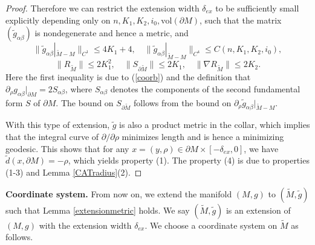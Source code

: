 \documentclass[11pt,letterpaper]{amsart}
\numberwithin{equation}{section}
\theoremstyle{definition}
\theoremstyle{plain}
\theoremstyle{definition}
\theoremstyle{plain}
\theoremstyle{definition}
\theoremstyle{plain}
\newcommand{\vol}{\textrm{vol}}
\begin{document}
\begin{proof}
Therefore we can restrict the extension width $\delta_{ex}$ to be sufficiently small explicitly depending only on $n,K_1,K_2,i_0,\vol(\partial M)$, such that the matrix $(\widetilde{g}_{\alpha\beta})$ is nondegenerate and hence a metric, and 
\begin{equation}\label{curvatureextended}
\|\widetilde{g}_{\alpha\beta}|_{\widetilde{M}-M}\|_{C^1}\leqslant 4 K_1+4,\quad \|\widetilde{g}_{\alpha\beta}|_{\widetilde{M}-M}\|_{C^4}\leqslant C(n,K_1,K_2,i_0),
\end{equation}
$$\|R_{\widetilde{M}}\|\leqslant 2K_1^2, \quad \|S_{\partial \widetilde{M}}\|\leqslant 2K_1, \quad \|\nabla R_{\widetilde{M}}\|\leqslant 2K_2.$$
Here the first inequality is due to (\ref{coorb}) and the definition that $\partial_{\rho} g_{\alpha\beta} |_{\partial M}=2S_{\alpha\beta}$,
where $S_{\alpha\beta}$ denotes the components of the second fundamental form $S$ of $\partial M$. The bound on $S_{\partial \widetilde{M}}$ follows from the bound on $\partial_{\rho} \widetilde{g}_{\alpha\beta}|_{\widetilde{M}-M}$.

With this type of extension, $\widetilde{g}$ is also a product metric in the collar, which implies that the integral curve of $\partial/\partial \rho$ minimizes length and is hence a minimizing geodesic. This shows that for any $x=(y,\rho)\in \partial M \times[-\delta_{ex},0]$, we have $\widetilde{d}(x,\partial M)=-\rho$, which yields property (1). The property (4) is due to properties (1-3) and Lemma \ref{CATradius}(2).
\end{proof}


\noindent \textbf{Coordinate system.} From now on, we extend the manifold $(M,g)$ to $(\widetilde{M},\widetilde{g})$ such that Lemma \ref{extensionmetric} holds. We say $(\widetilde{M},\widetilde{g})$ is an extension of $(M,g)$ with the extension width $\delta_{ex}$. We choose a coordinate system on $\widetilde{M}$ as follows.
\end{document}
